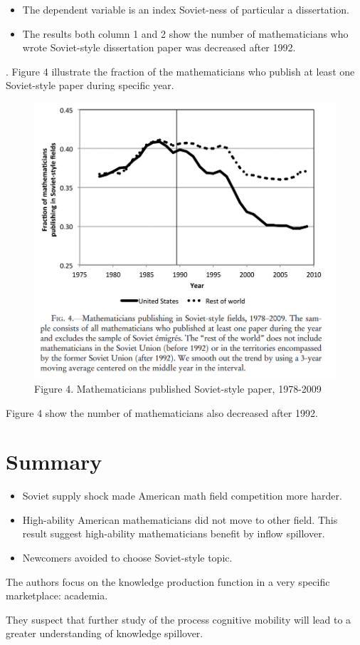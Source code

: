 \documentclass[../root]{subfiles}
\begin{document}
    \begin{itemize}
        \item The dependent variable is an index Soviet-ness of particular a dissertation.
        \item The results both column 1 and 2 show the number of mathematicians who wrote Soviet-style dissertation paper was decreased after 1992.
    \end{itemize}
    .
    Figure 4 illustrate the fraction of the mathematicians who publish at least one Soviet-style paper during specific year. 
    \begin{figure}
        \centering
        \includegraphics[width = \linewidth]{_images/0918sugiyama/Figure_4.png}
        \caption{Figure 4. Mathematicians published Soviet-style paper, 1978-2009}
        \label{fig:my_label}
    \end{figure}
    
    Figure 4 show the number of mathematicians also decreased after 1992.
    \section{Summary}
    
    \begin{itemize}
        \item Soviet supply shock made American math field competition more harder.  
        \item High-ability American mathematicians did not move to other field. This result suggest high-ability mathematicians benefit by inflow spillover. 
        \item Newcomers avoided to choose Soviet-style topic.
    \end{itemize}
    The authors focus on the knowledge production function in a very    specific marketplace: academia.
    
    They suspect that further study of the process cognitive mobility will lead to a greater understanding of knowledge spillover.  
    \biblio
    
\end{document}
